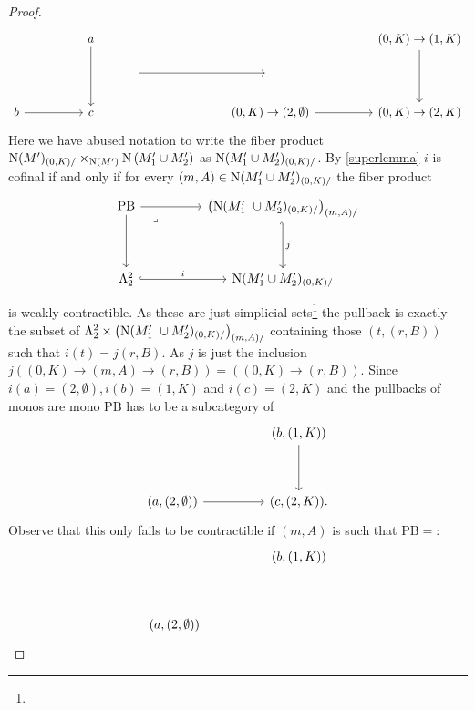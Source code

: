 \documentclass[../thesis.tex]{subfiles}
\begin{document}
\begin{proof}
    \[\begin{tikzcd}
            && a &&&&&& {(0,K)\to(1,K)} \\
            &&& {} &&& {} \\
            b && c &&&& {(0,K)\to(2,\emptyset)} && {(0,K)\to(2,K)}
            \arrow[from=1-9, to=3-9]
            \arrow[from=3-7, to=3-9]
            \arrow[from=3-1, to=3-3]
            \arrow[from=1-3, to=3-3]
            \arrow[from=2-4, to=2-7]
        \end{tikzcd}\]
    Here we have abused notation to write the fiber product $\mathrm{N}(M')_{(0, K) /} \times_{\mathrm{N}(M')}\mathrm{N}\left(M_1^{\prime} \cup M_2^{\prime}\right)$ as $ \mathrm{N}(M_1'\cup M_2')_{(0,K)/}$. By \ref{superlemma} $i$ is cofinal if and only if for every $(m,A) \in \mathrm{N}(M_1'\cup M_2')_{(0,K)/}$ the fiber product
    \[\begin{tikzcd}
            {\mathrm{PB}} && {\left(\Nerve(M_1' \cup M_2')_{(0,K)/}\right)_{(m,A)/}} \\
            \\
            {\Lambda_2^2} && {\Nerve(M_1'\cup M_2')_{(0,K)/}}
            \arrow[from=1-1, to=1-3]
            \arrow["j", hook',from=1-3, to=3-3]
            \arrow["i", hook,from=3-1, to=3-3]
            \arrow[from=1-1, to=3-1]
            \arrow["\lrcorner"{anchor=center, pos=0.125}, draw=none, from=1-1, to=3-3]
        \end{tikzcd}\]
    is weakly contractible.
    As these are just simplicial sets\footnote{} the pullback is exactly the subset of $\Lambda_2^2 \times \left(\Nerve(M_1' \cup M_2')_{(0,K)/}\right)_{(m,A)/}$ containing those $(t, (r, B))$ such that $i(t)=j(r,B)$.
    As $j$ is just the inclusion $j((0,K) \to (m, A) \to (r,B))=((0,K) \to (r,B))$.
    Since $i(a)=(2,\emptyset), i(b)=(1,K)$ and $i(c)=(2,K)$ and the pullbacks of monos are mono $\mathrm{PB}$ has to be a subcategory of
    \[\begin{tikzcd}
            && {(b,(1,K))} \\
            \\
            {(a,(2,\emptyset))} && {(c,(2,K))}
            \arrow[from=3-1, to=3-3]
            \arrow[from=1-3, to=3-3].
        \end{tikzcd}\]
    Observe that this only fails to be contractible if $(m,A)$ is such that $\mathrm{PB}=$:
    \[\begin{tikzcd}
            && {(b,(1,K))} \\
            \\
            {(a,(2,\emptyset))}
        \end{tikzcd}\]
\end{proof}
\end{document}
